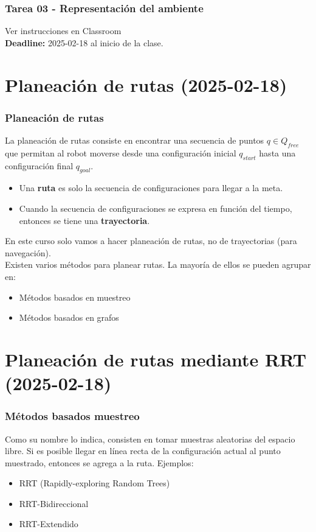 \begin{frame}[containsverbatim]\frametitle{Tarea 03 - Representación del ambiente}
  Ver instrucciones en Classroom
  \[\]
  \textbf{Deadline: } 2025-02-18 al inicio de la clase. 
\end{frame}

\section{Planeación de rutas (2025-02-18)}

\begin{frame}\frametitle{Planeación de rutas}
  La planeación de rutas consiste en encontrar una secuencia de puntos $q\in Q_{free}$ que permitan al robot moverse desde una configuración inicial $q_{start}$ hasta una configuración final $q_{goal}$.
  \begin{itemize}
  \item Una \textbf{ruta} es solo la secuencia de configuraciones para llegar a la meta.
  \item Cuando la secuencia de configuraciones se expresa en función del tiempo, entonces se tiene una \textbf{trayectoria}. 
  \end{itemize}
  En este curso solo vamos a hacer planeación de rutas, no de trayectorias (para navegación).\\
  Existen varios métodos para planear rutas. La mayoría de ellos se pueden agrupar en:
  \begin{itemize}
  \item Métodos basados en muestreo
  \item Métodos basados en grafos
  \end{itemize}
\end{frame}

\section{Planeación de rutas mediante RRT (2025-02-18)}
\begin{frame}\frametitle{Métodos basados muestreo}
  Como su nombre lo indica, consisten en tomar muestras aleatorias del espacio libre. Si es posible llegar en línea recta de la configuración actual al punto muestrado, entonces se agrega a la ruta.
  Ejemplos:
  \begin{itemize}
  \item RRT (Rapidly-exploring Random Trees)
  \item RRT-Bidireccional
  \item RRT-Extendido
  \end{itemize}
\end{frame}

